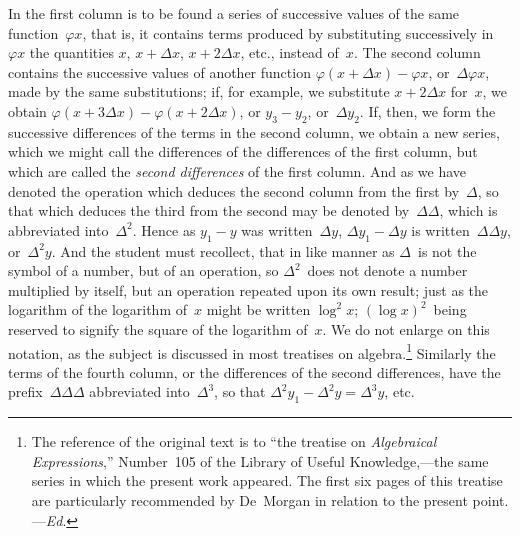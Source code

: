 \documentclass[12pt]{book}[2005/09/16]
\newcommand{\Pagelabel}[1]{\phantomsection\label{page:#1}}
\newcommand{\PageSep}[1]{\Pagelabel{#1}\ignorespaces}
\newcommand{\Ed}{\textit{Ed}}
\renewcommand{\(}{{\upshape(}}
\renewcommand{\)}{{\upshape)}}
\newcommand{\Title}[1]{\textit{#1}}
\renewcommand{\phi}{\varphi}
\begin{document}
In the first column is to be found a series of successive
values of the same function~$\phi x$, that is, it contains
terms produced by substituting successively in~$\phi x$
the quantities $x$, $x + \Delta x$, $x + 2\Delta x$, etc., instead of~$x$.
The second column contains the successive values
of another function $\phi(x + \Delta x) - \phi x$, or~$\Delta \phi x$, made by
the same substitutions; if, for example, we substitute
$x + 2\Delta x$ for~$x$, we obtain $\phi(x + 3\Delta x) - \phi(x + 2\Delta x)$,
or $y_{3} - y_{2}$, or~$\Delta y_{2}$. If, then, we form the successive
differences of the terms in the second column, we obtain
a new series, which we might call the differences
of the differences of the first column, but which are
called the \emph{second differences} of the first column. And
as we have denoted the operation which deduces the
second column from the first by~$\Delta$, so that which deduces
the third from the second may be denoted by~$\Delta\Delta$,
which is abbreviated into~$\Delta^{2}$. Hence as $y_{1} - y$
was written~$\Delta y$, $\Delta y_{1} - \Delta y$ is written~$\Delta\Delta y$, or~$\Delta^{2} y$. And
the student must recollect, that in like manner as $\Delta$~is
not the symbol of a number, but of an operation,
so $\Delta^{2}$~does not denote a number multiplied by itself,
but an operation repeated upon its own result; just
as the logarithm of the logarithm of~$x$ might be written
$\log^{2} x$; $(\log x)^{2}$~being reserved to signify the square
of the logarithm of~$x$. We do not enlarge on this notation,
as the subject is discussed in most treatises on
\PageSep{91}
algebra.\footnote
  {The reference of the original text is to ``the treatise on \Title{Algebraical Expressions},''
  Number~105 of the Library of Useful Knowledge,---the same series
  in which the present work appeared. The first six pages of this treatise are
  particularly recommended by De~Morgan in relation to the present point.---\Ed.}
Similarly the terms of the fourth column,
or the differences of the second differences, have the
prefix~$\Delta\Delta\Delta$ abbreviated into~$\Delta^{3}$, so that $\Delta^{2} y_{1} - \Delta^{2} y = \Delta^{3} y$, etc.
\end{document}
